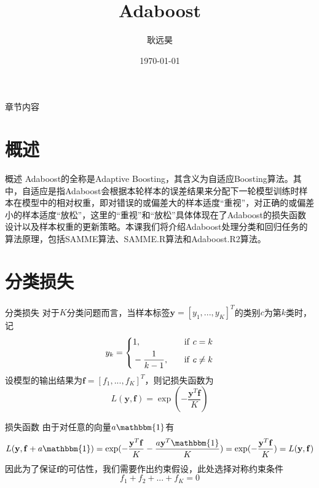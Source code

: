 \documentclass{ctexbeamer}        %
\begin{document}
\title{Adaboost}
\author{耿远昊}
\date{\today}
\frame{\titlepage}

\begin{frame}{章节内容}
  \tableofcontents[hideallsubsections]
\end{frame}


\section{概述}
\begin{frame}{概述}
Adaboost的全称是Adaptive Boosting，其含义为自适应Boosting算法。其中，自适应是指Adaboost会根据本轮样本的误差结果来分配下一轮模型训练时样本在模型中的相对权重，即对错误的或偏差大的样本适度“重视”，对正确的或偏差小的样本适度“放松”，这里的“重视”和“放松”具体体现在了Adaboost的损失函数设计以及样本权重的更新策略。本课我们将介绍Adaboost处理分类和回归任务的算法原理，包括SAMME算法、SAMME.R算法和Adaboost.R2算法。
\end{frame}
\section{分类损失}
\begin{frame}{分类损失}
对于$K$分类问题而言，当样本标签$\mathbf{y}=[y_1,...,y_K]^T$的类别$c$为第$k$类时，记
\begin{equation}
\notag
y_k=\left\{
\begin{aligned}
&1,\quad &{\rm if}\ c=k\\
&-\frac{1}{k-1},\quad &{\rm if}\ c\neq k
\end{aligned}
\right.
\end{equation}
设模型的输出结果为$\mathbf{f}=[f_1,...,f_K]^T$，则记损失函数为
$$L(\mathbf{y},\mathbf{f})=\exp(-\frac{\mathbf{y}^T\mathbf{f}}{K})$$
\end{frame}
\begin{frame}{损失函数}
由于对任意的向量$a\mathbbm{1}$有
$$L(\mathbf{y}, \mathbf{f}+a\mathbbm{1})=\exp(-\frac{\mathbf{y}^T\mathbf{f}}{K}-\frac{a\mathbf{y}^T\mathbbm{1}}{K})=\exp(-\frac{\mathbf{y}^T\mathbf{f}}{K})=L(\mathbf{y}, \mathbf{f})$$
因此为了保证$\mathbf{f}$的可估性，我们需要作出约束假设，此处选择对称约束条件
$$f_1+f_2+...+f_K=0$$
\end{frame}
\end{document}
